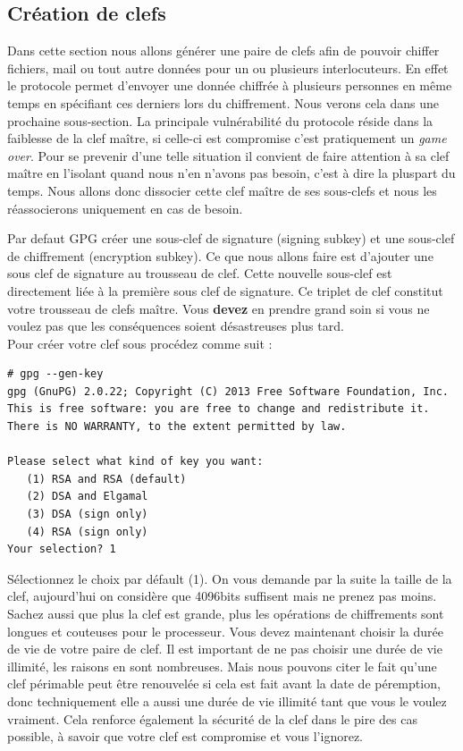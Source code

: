 \documentclass[a4paper]{article}
\begin{document}
\subsection{Création de clefs}

Dans cette section nous allons générer une paire de clefs afin de pouvoir
chiffer fichiers, mail ou tout autre données pour un ou plusieurs
interlocuteurs. En effet le protocole permet d'envoyer une donnée chiffrée à
plusieurs personnes en même temps en spécifiant ces derniers lors du
chiffrement. Nous verons cela dans une prochaine sous-section.
La principale vulnérabilité du protocole réside dans la faiblesse de la clef
maître, si celle-ci est compromise c'est pratiquement un \emph{game over}.
Pour se prevenir d'une telle situation il convient de faire attention à sa clef
maître en l'isolant quand nous n'en n'avons pas besoin, c'est à dire la pluspart
du temps. Nous allons donc dissocier cette clef maître de ses sous-clefs et
nous les réassocierons uniquement en cas de besoin.

Par defaut \textsc{GPG} créer une sous-clef de signature (signing subkey) et
une sous-clef de chiffrement (encryption subkey). Ce que nous allons faire est
d'ajouter une sous clef de signature au trousseau de clef. Cette nouvelle
sous-clef est directement liée à la première sous clef de signature. Ce triplet
de clef constitut votre trousseau de clefs maître. Vous \textbf{devez} en prendre grand
soin si vous ne voulez pas que les conséquences soient désastreuses plus tard.
\\
Pour créer votre clef sous procédez comme suit :
\begin{verbatim}
# gpg --gen-key
gpg (GnuPG) 2.0.22; Copyright (C) 2013 Free Software Foundation, Inc.
This is free software: you are free to change and redistribute it.
There is NO WARRANTY, to the extent permitted by law.

Please select what kind of key you want:
   (1) RSA and RSA (default)
   (2) DSA and Elgamal
   (3) DSA (sign only)
   (4) RSA (sign only)
Your selection? 1
\end{verbatim}

Sélectionnez le choix par défault (1). On vous demande par la suite la taille
de la clef, aujourd'hui on considère que 4096bits suffisent mais ne prenez pas
moins. Sachez aussi que plus la clef est grande, plus les opérations de
chiffrements sont longues et couteuses pour le processeur.
\newpage
Vous devez maintenant choisir la durée de vie de votre paire de clef. Il est
important de ne pas choisir une durée de vie illimité, les raisons en sont
nombreuses. Mais nous pouvons citer le fait qu'une clef périmable peut être
renouvelée si cela est fait avant la date de péremption, donc techniquement elle
a aussi une durée de vie illimité tant que vous le voulez vraiment.
Cela renforce également la sécurité de la clef dans le pire des cas possible,
à savoir que votre clef est compromise et vous l'ignorez.
\end{document}
